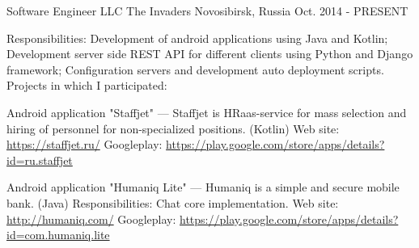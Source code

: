 


\begin{cventries}


\cventry
{Software Engineer} %
{LLC The Invaders} %
{Novosibirsk, Russia} %
{Oct. 2014 - PRESENT} %
{
Responsibilities: Development of android applications using Java and Kotlin; Development server side REST API for different clients using Python and Django framework; Configuration servers and development auto deployment scripts.\linebreak
\linebreak
Projects in which I participated:\linebreak
\linebreak
\begin{cvitems}
    \item {
        \begin{flushleft}
            Android application "Staffjet" --- Staffjet is HRaas-service for mass selection and hiring of personnel for non-specialized positions. (Kotlin)\linebreak
            Web site: \url{https://staffjet.ru/}\linebreak
            Googleplay: \url{https://play.google.com/store/apps/details?id=ru.staffjet}\linebreak
        \end{flushleft}
    }
    \item {
        \begin{flushleft}
            Android application "Humaniq Lite" --- Humaniq is a simple and secure mobile bank. (Java)\linebreak
            Responsibilities: Chat core implementation.\linebreak
            Web site: \url{http://humaniq.com/}\linebreak
            Googleplay: \url{https://play.google.com/store/apps/details?id=com.humaniq.lite}\linebreak

\end{flushleft}}
\end{cvitems}}
\end{cventries}
